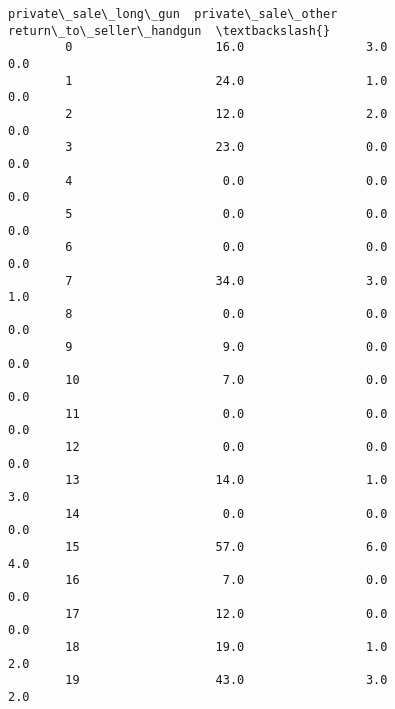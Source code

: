 \documentclass[11pt]{article}
\begin{document}
\begin{Verbatim}[commandchars=\\\{\}]
            private\_sale\_long\_gun  private\_sale\_other  return\_to\_seller\_handgun  \textbackslash{}
        0                    16.0                 3.0                       0.0   
        1                    24.0                 1.0                       0.0   
        2                    12.0                 2.0                       0.0   
        3                    23.0                 0.0                       0.0   
        4                     0.0                 0.0                       0.0   
        5                     0.0                 0.0                       0.0   
        6                     0.0                 0.0                       0.0   
        7                    34.0                 3.0                       1.0   
        8                     0.0                 0.0                       0.0   
        9                     9.0                 0.0                       0.0   
        10                    7.0                 0.0                       0.0   
        11                    0.0                 0.0                       0.0   
        12                    0.0                 0.0                       0.0   
        13                   14.0                 1.0                       3.0   
        14                    0.0                 0.0                       0.0   
        15                   57.0                 6.0                       4.0   
        16                    7.0                 0.0                       0.0   
        17                   12.0                 0.0                       0.0   
        18                   19.0                 1.0                       2.0   
        19                   43.0                 3.0                       2.0   
        

\end{Verbatim}
\end{document}
